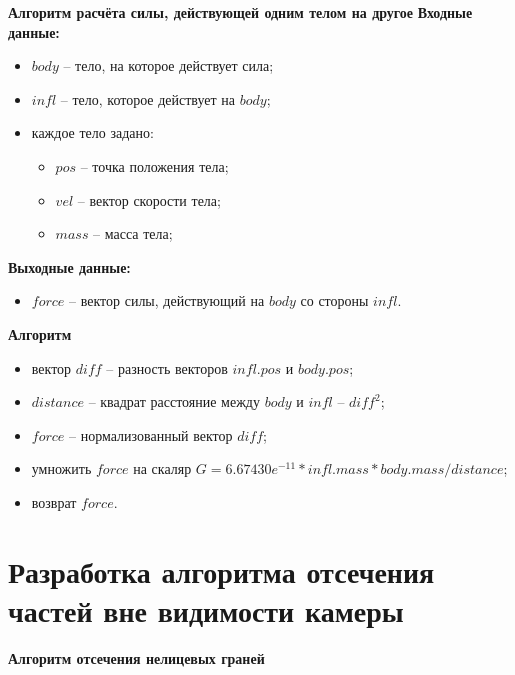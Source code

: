 \textbf{Алгоритм расчёта силы, действующей одним телом на другое}
\textbf{Входные данные:}
\begin{itemize}
	\item $body$ -- тело, на которое действует сила;
	\item $infl$ -- тело, которое действует на $body$;
	\item каждое тело задано:
	\begin{itemize}
		\item $pos$ -- точка положения тела;
		\item $vel$ -- вектор скорости тела;
		\item $mass$ -- масса тела;
	\end{itemize}
\end{itemize}

\textbf{Выходные данные:}
\begin{itemize}
	\item $force$ -- вектор силы, действующий на $body$ со стороны $infl$.
\end{itemize}

\textbf{Алгоритм}

\begin{itemize}
	\item вектор $diff$ -- разность векторов $infl.pos$ и $body.pos$;
	\item $distance$ -- квадрат расстояние между $body$ и $infl$ -- $diff^2$;
	\item $force$ -- нормализованный вектор $diff$;
	\item умножить $force$ на скаляр $G=6.67430e^{-11} * infl.mass * body.mass / distance$;
	\item возврат $force$.
\end{itemize}

\section{Разработка алгоритма отсечения частей вне видимости камеры}

\textbf{Алгоритм отсечения нелицевых граней}

